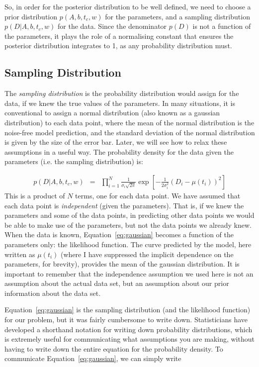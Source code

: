 So, in order for the posterior distribution to be well defined, we need to
choose a prior distribution $p(A, b, t_c, w)$ for the parameters, and a
sampling distribution $p(D | A, b, t_c, w)$ for the data. Since the denominator
$p(D)$ is not a function of the parameters, it plays the role of a normalising
constant that ensures the posterior distribution integrates to 1, as any
probability distribution must.

\subsection{Sampling Distribution}
The {\it sampling distribution} is the probability distribution would assign
for the data, if we knew the true values of the parameters.
In many situations, it is conventional to assign a normal distribution
(also known as a gaussian distribution) to each data point, where the mean
of the normal distribution is the noise-free model prediction, and the
standard deviation of the normal distribution is given by the size of the
error bar. Later, we will see how to relax these assumptions in a useful way.
The probability density for the data given the parameters (i.e. the sampling
distribution) is:

\begin{eqnarray}
p(D | A, b, t_c, w) &=& \prod_{i=1}^N \frac{1}{\sigma_i \sqrt{2\pi}}
\exp\left[-\frac{1}{2\sigma_i^2}\left(D_i - \mu(t_i)\right)^2\right]\label{eq:gaussian}
\end{eqnarray}
This is a product of $N$ terms, one for each data point. We have assumed that
each data point is {\it independent} (given the parameters). That is, if we
knew the parameters and some of the data points, in predicting other data points
we would be able to make use of the parameters, but not the data points we
already knew. When the data is known, Equation~\ref{eq:gaussian} becomes a
function of the parameters only: the likelihood function. The curve predicted
by the model, here written as $\mu(t_i)$ (where I have suppressed the implicit
dependence on the parameters, for brevity), provides the mean of the gaussian
distribution. It is important to remember that the independence assumption we
used here is not an assumption about the actual data set, but an assumption
about our prior information about the data set.

Equation~\ref{eq:gaussian} is the sampling distribution
(and the likelihood function) for our problem, but it
was fairly cumbersome to write down. Statisticians have developed a shorthand
notation for writing down probability distributions, which is extremely useful
for communicating what assumptions you are making, without having to write down
the entire equation for the probability density. To communicate
Equation~\ref{eq:gaussian}, we can simply write


